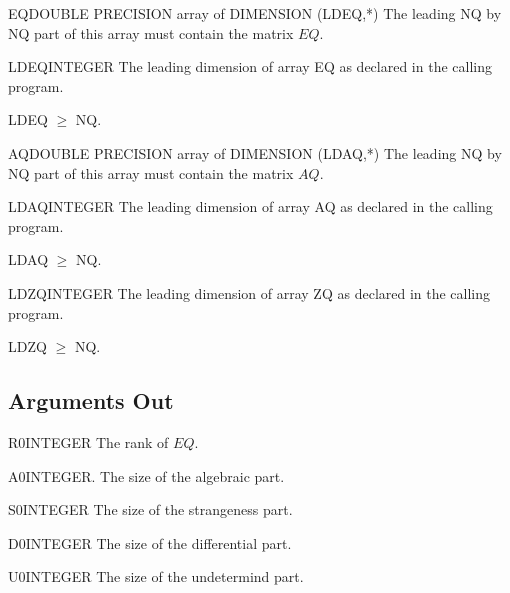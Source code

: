 \begin{entry}{EQ}{DOUBLE PRECISION array of DIMENSION (LDEQ,*)}
  The leading NQ by NQ part of this array must contain the matrix $EQ$.
\end{entry}

\begin{entry}{LDEQ}{INTEGER}
  The leading dimension of array EQ as declared in the calling
  program.

  LDEQ $\ge$ NQ.
\end{entry}

\begin{entry}{AQ}{DOUBLE PRECISION array of DIMENSION (LDAQ,*)}
  The leading NQ by NQ part of this array must contain the matrix $AQ$.
\end{entry}

\begin{entry}{LDAQ}{INTEGER}
  The leading dimension of array AQ as declared in the calling
  program. 

  LDAQ $\ge$ NQ.
\end{entry}

\begin{entry}{LDZQ}{INTEGER}
  The leading dimension of array ZQ as declared in the calling
  program. 

  LDZQ $\ge$ NQ.
\end{entry}

\subsection{Arguments Out}

\begin{entry}{R0}{INTEGER}
  The rank of $EQ$.
\end{entry}

\begin{entry}{A0}{INTEGER.}
  The size of the algebraic part.
\end{entry}

\begin{entry}{S0}{INTEGER}
  The size of the strangeness part.
\end{entry}

\begin{entry}{D0}{INTEGER}
  The size of the differential part.
\end{entry}

\begin{entry}{U0}{INTEGER}
  The size of the undetermind part.
\end{entry}

